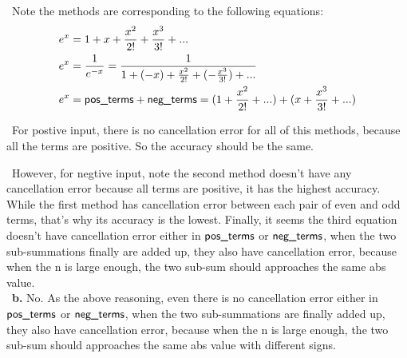 \documentclass[11pt,fleqn]{exam}
\newcommand{\nn}{~\newline \noindent }
\newcommand{\mname}[1]{\mbox{\sf #1}}
\begin{document}
\nn Note the methods are corresponding to the following equations:\\
\begin{align*}
e^x &= 1 + x + \frac{x^2}{2!} + \frac{x^3}{3!} + ...  \\
e^x &= \frac{1}{e^{-x}} = \frac{1}{1 + (-x) + \frac{x^2}{2!} + (-\frac{x^3}{3!}) + ...} \\
e^x &= \mname{pos\_terms} + \mname{neg\_terms} = (1 + \frac{x^2}{2!} + ... ) + (x + \frac{x^3}{3!} + ... )	   
\end{align*}

\nn For postive input, there is no cancellation error for all of this methods, because all the terms are positive. So the accuracy should be the same.

\nn However, for negtive input, note the second method doesn't have any cancellation error because all terms are positive, it has the highest accuracy. While the first method has cancellation error between each pair of even and odd terms, that's why its accuracy is the lowest. Finally, it seems the third equation doesn't have cancellation error either in $\mname{pos\_terms}$ or $\mname{neg\_terms}$, when the two sub-summations finally are added up, they also have cancellation error, because when the n is large enough, the two sub-sum should approaches the same abs value.\\

\nn \textbf{b.} No. As the above reasoning, even there is no cancellation error either in $\mname{pos\_terms}$ or $\mname{neg\_terms}$, when the two sub-summations are finally added up, they also have cancellation error, because when the n is large enough, the two sub-sum should approaches the same abs value with different signs. 
\end{document}
